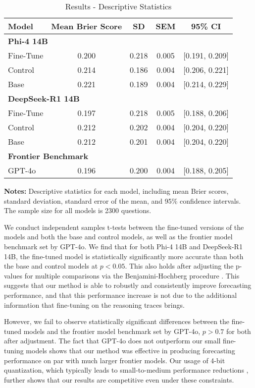 \documentclass{article}
\begin{document}
\begin{table}[htbp]
  \centering
  \caption{Results - Descriptive Statistics}
  \label{tab:descriptive}
  \begin{tabular}{lcccc}
    \toprule
    \textbf{Model} & \textbf{Mean Brier Score} & \textbf{SD} & \textbf{SEM} & \textbf{95\% CI} \\
    \midrule
    \multicolumn{5}{l}{\textbf{Phi-4 14B}} \\
    Fine-Tune & 0.200 & 0.218 & 0.005 & [0.191, 0.209] \\
    Control   & 0.214 & 0.186 & 0.004 & [0.206, 0.221] \\
    Base      & 0.221 & 0.189 & 0.004 & [0.214, 0.229] \\
    \midrule
    \multicolumn{5}{l}{\textbf{DeepSeek-R1 14B}} \\
    Fine-Tune & 0.197 & 0.218 & 0.005 & [0.188, 0.206] \\
    Control   & 0.212 & 0.202 & 0.004 & [0.204, 0.220] \\
    Base      & 0.212 & 0.201 & 0.004 & [0.204, 0.220] \\
    \midrule
    \multicolumn{5}{l}{\textbf{Frontier Benchmark}} \\
    GPT-4o    & 0.196 & 0.200 & 0.004 & [0.188, 0.205] \\
    \bottomrule
  \end{tabular}
  
  \vspace{1ex}
  \textbf{Notes:} Descriptive statistics for each model, including mean Brier scores, standard deviation, standard error of the mean, and 95\% confidence intervals. The sample size for all models is 2300 questions.
\end{table}

We conduct independent samples t-tests between the fine-tuned versions of the models and both the base and control models, as well as the frontier model benchmark set by GPT-4o. We find that for both Phi-4 14B and DeepSeek-R1 14B, the fine-tuned model is statistically significantly more accurate than both the base and control models at $p<0.05$. This also holds after adjusting the p-values for multiple comparisons via the Benjamini-Hochberg procedure \citep{Benjamini1995}. This suggests that our method is able to robustly and consistently improve forecasting performance, and that this performance increase is not due to the additional information that fine-tuning on the reasoning traces brings.

However, we fail to observe statistically significant differences between the fine-tuned models and the frontier model benchmark set by GPT-4o, $p>0.7$ for both after adjustment. The fact that GPT-4o does not outperform our small fine-tuning models shows that our method was effective in producing forecasting performance on par with much larger frontier models. Our usage of 4-bit quantization, which typically leads to small-to-medium performance reductions \citep{Zem2024, Huang2024}, further shows that our results are competitive even under these constraints.
\end{document}
